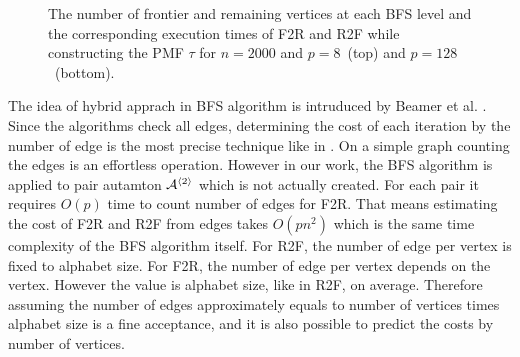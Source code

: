 \documentclass[12pt]{article}
\newcommand{\comment}[2]{{\color{red}{\bf (#1: #2)}}}
\begin{document}
\begin{figure}[ht]
{}
\caption{The number of frontier and remaining vertices at each BFS level and the corresponding execution times of F2R and R2F while constructing the PMF $\tau$ for $n = 2000$ and $p = 8$~(top) and $p=128$~(bottom). 
\comment{sertac}{sayilardaki virguller nokta olmali.}%
}
\label{fig:BFS-vtcomparison}
\vspace*{-3ex}
\end{figure}

The idea of hybrid apprach in BFS algorithm is intruduced by Beamer et al. \cite{Beamer}. Since the algorithms check all edges, determining the cost of each iteration by the number of edge is the most precise technique like in \cite{Beamer}. On a simple graph counting the edges is an effortless operation. However in our work, the BFS algorithm is applied to pair autamton ${\cal A}^{\langle 2 \rangle}$ which is not actually created. For each pair it requires $O(p)$ time to count number of edges for F2R. That means estimating the cost of F2R and R2F from edges takes $O(pn^2)$ which is the same time complexity of the BFS algorithm itself. For R2F, the number of edge per vertex is fixed to alphabet size. For F2R, the number of edge per vertex depends on the vertex. However the value is alphabet size, like in R2F, on average. Therefore assuming the number of edges approximately equals to number of vertices times alphabet size is a fine acceptance, and it is also possible to predict the costs by number of vertices.
\end{document}

